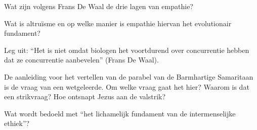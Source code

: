 \documentclass[main.tex]{subfiles}
\begin{document}
\begin{examenvraag}
    \begin{vraag}
        Wat zijn volgens Frans De Waal de drie lagen van empathie?
    \end{vraag}

    \begin{antwoord}
    \end{antwoord}
\end{examenvraag}


\begin{examenvraag}
    \begin{vraag}
        Wat is altruïsme en op welke manier is empathie hiervan het evolutionair fundament?
    \end{vraag}

    \begin{antwoord}
    \end{antwoord}
\end{examenvraag}


\begin{examenvraag}
    \begin{vraag}
        Leg uit: “Het is niet omdat biologen het voortdurend over concurrentie hebben dat ze concurrentie aanbevelen” (Frans De Waal).
    \end{vraag}

    \begin{antwoord}
    \end{antwoord}
\end{examenvraag}


\begin{examenvraag}
    \begin{vraag}
        De aanleiding voor het vertellen van de parabel van de Barmhartige Samaritaan is de vraag van een wetgeleerde. Om welke vraag gaat het hier? Waarom is dat een strikvraag? Hoe ontsnapt Jezus aan de valstrik?
    \end{vraag}

    \begin{antwoord}
    \end{antwoord}
\end{examenvraag}


\begin{examenvraag}
    \begin{vraag}
        Wat wordt bedoeld met “het lichamelijk fundament van de intermenselijke ethiek”?
    \end{vraag}

    \begin{antwoord}
    \end{antwoord}
\end{examenvraag}
\end{document}
